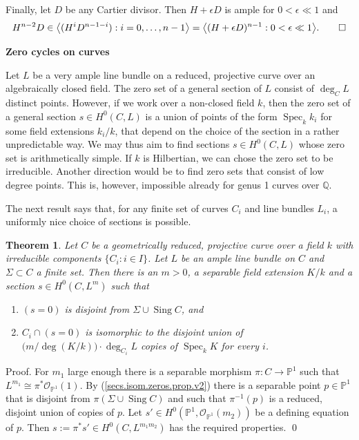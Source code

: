 \documentclass{amsart}
\newtheorem{thm}{Theorem}%
\theoremstyle{definition}
\theoremstyle{remark}
\renewcommand{\o}[0]{{\mathcal O}}
\newcommand{\p}[0]{{\mathbb P}}
\newcommand{\q}[0]{{\mathbb Q}}
\newcommand{\spec}[0]{\operatorname{Spec}}
\newcommand{\sing}[0]{\operatorname{Sing}}
\begin{document}
Finally, let $D$ be any Cartier divisor. Then
$H+\epsilon D$  is ample for $0<\epsilon\ll 1$ and
$$
H^{n-2}D\in \bigl\langle (H^iD^{n-1-i}) : i=0,\dots, n-1\bigr\rangle =
\bigl\langle (H+\epsilon D)^{n-1} : 0<\epsilon\ll 1\bigr\rangle. \qed
$$




\medskip
{\bf Zero cycles on curves}
\medskip

Let $L$ be a very ample line bundle on a reduced, projective curve over an algebraically closed field. The zero set of a general section
of $L$ consist of $\deg_CL$ distinct points.
However, if we work over a non-closed field $k$, then 
the zero set of a general section $s\in H^0(C, L)$ is a union of points of the form
$\spec_k k_i$ for some field extensions $k_i/k$, that depend on the choice of the section in a rather unpredictable way. 
We may thus aim to find sections $s\in H^0(C, L)$ whose zero set is arithmetically simple.  If $k$ is Hilbertian, we can chose the zero set to be irreducible. 
Another direction would be to find zero sets that consist of low degree points.
This is, however, impossible
already for genus 1 curves over $\q$.

The next result says that, for any finite set of curves $C_i$ and line bundles
$L_i$, a uniformly nice choice of sections is possible.



\begin{thm} \label{secs.isom.zeros.prop.c1.cor}
Let $C$ be a  geometrically reduced, projective   curve over   a field   $k$ 
with  irreducible components $\{C_i: i\in I\}$.
Let $L$ be an ample line bundle on $C$ and $\Sigma\subset C$ a finite set.
 Then there is an $m>0$, a separable field extension $K/k$ 
and a section $s\in H^0(C, L^m)$ such that 
\begin{enumerate}
\item $(s=0)$ is disjoint from $\Sigma\cup \sing C$, and
\item  $C_i\cap (s=0)$ is  isomorphic to the disjoint  union of $\bigl(m/\deg (K/k)\bigr)\cdot \deg_{C_i}L $ copies of  $\spec_kK$ for every $i$. 
\end{enumerate}
\end{thm}

Proof.   For $m_1$ large enough  there is a 
 separable morphism  $\pi:C\to \p^1$ such that $L^{m_1}\cong \pi^*\o_{\p^1}(1)$.
By (\ref{secs.isom.zeros.prop.v2})  there is  a separable point $p\in \p^1$ 
that is disjoint from $\pi(\Sigma\cup \sing C)$ and 
such that 
 $\pi^{-1}(p)$ is a reduced, disjoint union of  copies of $p$.
Let $s'\in H^0(\p^1, \o_{\p^1}(m_2))$ be a defining equation of $p$.
Then $s:=\pi^*s'\in H^0(C, L^{m_1m_2})$ has the required properties. \qed
\end{document}
